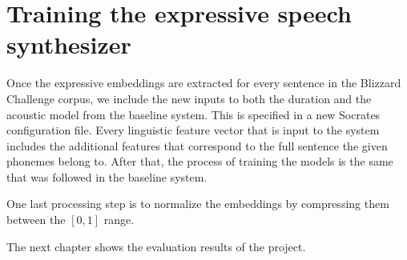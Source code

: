 \section{Training the expressive speech synthesizer}

Once the expressive embeddings are extracted for every sentence in the Blizzard Challenge corpus, we include the new inputs to both the duration and the acoustic model from the baseline system. This is specified in a new Socrates configuration file. Every linguistic feature vector that is input to the system includes the additional features that correspond to the full sentence the given phonemes belong to. After that, the process of training the models is the same that was followed in the baseline system.

One last processing step is to normalize the embeddings by compressing them between the $[0, 1]$ range.

The next chapter shows the evaluation results of the project.
